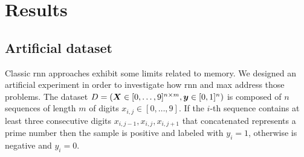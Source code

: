 
\section{Results}
\subsection{Artificial dataset}\label{sec:experiments}
Classic \ac{rnn} approaches exhibit some limits related to
memory. We designed an artificial experiment in
order to investigate how \ac{rnn} and \ac{max} address those
problems. The dataset 
$D=(\bm{X}\in [0,\dots,9]^{n\times m},\bm{y}\in [0,1]^n)$ is
composed of $n$ sequences of length
$m$ of digits $x_{i,j}\in[0,\dots,9]$. If the $i$-th sequence contains
at least three consecutive digits
$x_{i,j-1},x_{i,j},x_{i,j+1}$ that concatenated represents a prime
number then the
sample is positive and labeled with $y_i=1$, otherwise is negative and
$y_i=0$.

